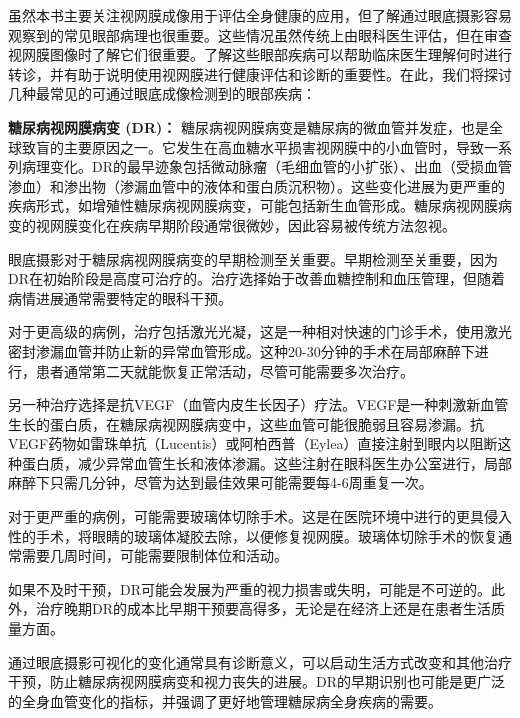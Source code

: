 \documentclass[
  Letterpaper,
]{scrbook}
\begin{document}
虽然本书主要关注视网膜成像用于评估全身健康的应用，但了解通过眼底摄影容易观察到的常见眼部病理也很重要。这些情况虽然传统上由眼科医生评估，但在审查视网膜图像时了解它们很重要。了解这些眼部疾病可以帮助临床医生理解何时进行转诊，并有助于说明使用视网膜进行健康评估和诊断的重要性。在此，我们将探讨几种最常见的可通过眼底成像检测到的眼部疾病：

\textbf{糖尿病视网膜病变 (DR)：}
糖尿病视网膜病变是糖尿病的微血管并发症，也是全球致盲的主要原因之一。它发生在高血糖水平损害视网膜中的小血管时，导致一系列病理变化。DR的最早迹象包括微动脉瘤（毛细血管的小扩张）、出血（受损血管渗血）和渗出物（渗漏血管中的液体和蛋白质沉积物）。这些变化进展为更严重的疾病形式，如增殖性糖尿病视网膜病变，可能包括新生血管形成。糖尿病视网膜病变的视网膜变化在疾病早期阶段通常很微妙，因此容易被传统方法忽视。

眼底摄影对于糖尿病视网膜病变的早期检测至关重要。早期检测至关重要，因为DR在初始阶段是高度可治疗的。治疗选择始于改善血糖控制和血压管理，但随着病情进展通常需要特定的眼科干预。

对于更高级的病例，治疗包括激光光凝，这是一种相对快速的门诊手术，使用激光密封渗漏血管并防止新的异常血管形成。这种20-30分钟的手术在局部麻醉下进行，患者通常第二天就能恢复正常活动，尽管可能需要多次治疗。

另一种治疗选择是抗VEGF（血管内皮生长因子）疗法。VEGF是一种刺激新血管生长的蛋白质，在糖尿病视网膜病变中，这些血管可能很脆弱且容易渗漏。抗VEGF药物如雷珠单抗（Lucentis）或阿柏西普（Eylea）直接注射到眼内以阻断这种蛋白质，减少异常血管生长和液体渗漏。这些注射在眼科医生办公室进行，局部麻醉下只需几分钟，尽管为达到最佳效果可能需要每4-6周重复一次。

对于更严重的病例，可能需要玻璃体切除手术。这是在医院环境中进行的更具侵入性的手术，将眼睛的玻璃体凝胶去除，以便修复视网膜。玻璃体切除手术的恢复通常需要几周时间，可能需要限制体位和活动。

如果不及时干预，DR可能会发展为严重的视力损害或失明，可能是不可逆的。此外，治疗晚期DR的成本比早期干预要高得多，无论是在经济上还是在患者生活质量方面。

通过眼底摄影可视化的变化通常具有诊断意义，可以启动生活方式改变和其他治疗干预，防止糖尿病视网膜病变和视力丧失的进展。DR的早期识别也可能是更广泛的全身血管变化的指标，并强调了更好地管理糖尿病全身疾病的需要。
\end{document}
